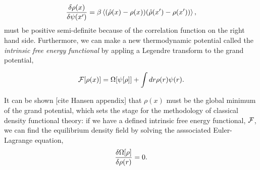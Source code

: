 \begin{equation}
    \frac{\delta \rho(x)}{\delta \psi(x^\prime)} = \beta \left\langle  (\hat{\rho}(x) - \rho(x))(\hat{\rho}(x^\prime) - \rho(x^\prime)) \right\rangle, 
\end{equation}
must be positive semi-definite because of the correlation function on the right hand side. Furthermore, we can make a new thermodynamic potential called the \textit{intrinsic free energy functional} by appling a Legendre transform to the grand potential,

\begin{equation}
    \mathcal{F}[\rho(x)] = \Omega[\psi[\rho]] + \int dr \rho(r) \psi(r).
\end{equation}

It can be shown [cite Hansen appendix] that $\rho(x)$ must be the global minimum of the grand potential, which sets the stage for the methodology of classical density functional theory: if we have a defined intrinsic free energy functional, $\mathcal{F}$, we can find the equilibrium density field by solving the asssociated Euler-Lagrange equation, 
\begin{equation}
    \frac{\delta \Omega[\rho]}{\delta \rho(r)} = 0.
\end{equation}
